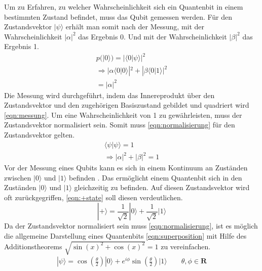 Um zu Erfahren, zu welcher Wahrscheinlichkeit sich ein Quantenbit in einem bestimmten Zustand befindet, muss das Qubit gemessen werden. F\"ur den Zustandsvektor $|\psi\rangle$ erh\"alt man somit nach der Messung, mit der Wahrscheinlichkeit $|\alpha|^2$ das Ergebnis 0. Und mit der Wahrscheinlichkeit $|\beta|^2$ das Ergebnis 1.
\begin{equation}\label{eqn:messung}
        \begin{gathered}
                p(|0\rangle) = |\langle 0|\psi \rangle|^2 \\
                \Rightarrow | \alpha \langle 0|0 \rangle|^2 + |\beta \langle 0|1 \rangle |^2 \\
                = | \alpha |^2
        \end{gathered}       
\end{equation}
Die Messung wird durchgef\"uhrt, indem das Innereprodukt \"uber den Zustandsvektor und den zugeh\"origen Basiszustand gebildet und quadriert wird \ref{eqn:messung}. Um eine Wahrscheinlichkeit von 1 zu gew\"ahrleisten, muss der Zustandsvektor normalisiert sein. Somit muss \ref{eqn:normalisierung} f\"ur den Zustandsvektor gelten.
\begin{equation}\label{eqn:normalisierung}
\begin{gathered}
         \langle \psi | \psi \rangle = 1 \\
         \Rightarrow |\alpha|^2 +|\beta|^2 = 1
\end{gathered}
\end{equation}
Vor der Messung eines Qubits kann es sich in einem Kontinuum an Zust\"anden zwischen $|0\rangle$ und $|1\rangle$ befinden \cite{nielsen_chuang_2010}. Das erm\"oglicht einem Quantenbit sich in den Zust\"anden $|0\rangle$ und $|1\rangle$ gleichzeitig zu befinden. Auf diesen Zustandsvektor wird oft zur\"uckgegriffen, \ref{eqn:+state} soll diesen verdeutlichen.
\begin{equation}\label{eqn:+state}
|+\rangle = \frac{1}{\sqrt{2}}|0\rangle+\frac{1}{\sqrt{2}}|1\rangle
\end{equation}
Da der Zustandsvektor normalisiert sein muss \ref{eqn:normalisierung}, ist es m\"oglich die allgemeine Darstellung eines Quantenbits \ref{eqn:superposition} mit Hilfe des Additionstheorems $\sqrt{\sin(x)^2+\cos(x)^2} = 1$ zu vereinfachen.
\begin{equation}\label{eqn:bloch-kugel}
\begin{gathered}
|\psi\rangle = \cos\left(\frac{\theta}{2}\right)|0\rangle+e^{i\phi}\sin\left(\frac{\theta}{2}\right)|1\rangle \qquad \theta, \phi \in \mathbf{R}
\end{gathered}
\end{equation}
